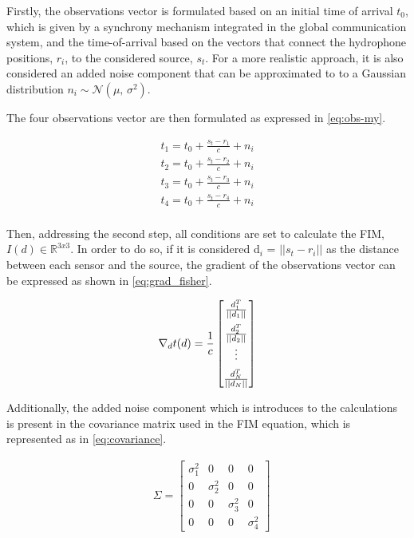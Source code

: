 Firstly, the observations vector is formulated based on an initial time of arrival $t_0$, which is given by a synchrony mechanism integrated in the global communication system, and the time-of-arrival based on the vectors that connect the hydrophone positions, $r_i$, to the considered source, $s_t$. For a more realistic approach, it is also considered an added noise component that can be approximated to to a Gaussian distribution $n_i \sim \mathcal{N}(\mu,\,\sigma^{2})$. 

The four observations vector are then formulated as expressed in \ref{eq:obs-my}.

\begin{eqnarray}
	t_1 = t_0 + \frac{s_t - r_1}{c} + n_i \\
	t_2 = t_0 + \frac{s_t - r_2}{c} + n_i \\
	t_3 = t_0 + \frac{s_t - r_3}{c} + n_i \\
	t_4 = t_0 + \frac{s_t - r_4}{c} + n_i \\
	\label{eq:obs-my}
\end{eqnarray}

Then, addressing the second step, all conditions are set to calculate the FIM,  $I(d) \in \mathbb{R}^{3x3}$. In order to do so, if it is considered d$_{i}$ = $|| s_{t} - r_{i} ||$ as the distance between each sensor and the source, the gradient of the observations vector can be expressed as shown in \ref{eq:grad_fisher}.

\begin{eqnarray}
	\nabla_{d}t(d) = \frac{1}{c} 
	\begin{bmatrix}
	\frac{d_1^T}{||d_1||} \\ 
	\addlinespace
	\frac{d_2^T}{||d_2||} \\
	\vdots \\
	\addlinespace
	\frac{d_N^T}{||d_N||}
	\end{bmatrix}
	\label{eq:grad_fisher}
\end{eqnarray}

Additionally, the added noise component which is introduces to the calculations is present in the covariance matrix used in the FIM equation, which is represented as in \ref{eq:covariance}.

\begin{eqnarray}
& \Sigma = 
\begin{bmatrix}
\sigma_1^2 & 0 & 0 & 0 \\
0 & \sigma_2^2 & 0 & 0 \\
0 & 0  & \sigma_3^2  & 0 \\
0 & 0 & 0 & \sigma_4^2 
\end{bmatrix}
\label{eq:covariance}
\end{eqnarray}

